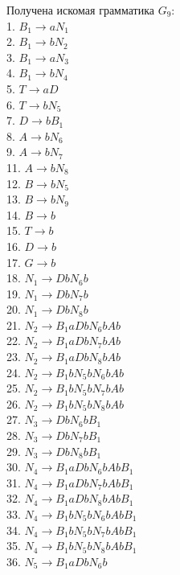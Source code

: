 \documentclass[a4paper,14pt]{extarticle}
\begin{document}
\begin{enumerate}[1.]
Получена искомая грамматика $G_9$:\\
1. $B_1 \rightarrow aN_1$\\
2. $B_1 \rightarrow bN_2$\\
3. $B_1 \rightarrow aN_3$\\
4. $B_1 \rightarrow bN_4$\\
5. $T \rightarrow aD$\\ 
6. $T \rightarrow bN_5$\\
7. $D \rightarrow bB_1$\\
8. $A \rightarrow bN_6$\\
9. $A \rightarrow bN_7$\\
11. $A \rightarrow bN_8$\\
12. $B \rightarrow bN_5$\\ 
13. $B \rightarrow bN_9$\\ 
14. $B \rightarrow b$\\
15. $T \rightarrow b$\\
16. $D \rightarrow b$\\
17. $G \rightarrow b$\\
18. $N_1 \rightarrow DbN_6b$\\
19. $N_1 \rightarrow DbN_7b$\\
20. $N_1 \rightarrow DbN_8b$\\
21. $N_2 \rightarrow B_1aDbN_6bAb$\\
22. $N_2 \rightarrow B_1aDbN_7bAb$\\
23. $N_2 \rightarrow B_1aDbN_8bAb$\\
24. $N_2 \rightarrow B_1bN_5bN_6bAb$\\
25. $N_2 \rightarrow B_1bN_5bN_7bAb$\\
26. $N_2 \rightarrow B_1bN_5bN_8bAb$\\
27. $N_3 \rightarrow DbN_6bB_1$\\
28. $N_3 \rightarrow DbN_7bB_1$\\
29. $N_3 \rightarrow DbN_8bB_1$\\
30. $N_4 \rightarrow B_1aDbN_6bAbB_1$\\
31. $N_4 \rightarrow B_1aDbN_7bAbB_1$\\
32. $N_4 \rightarrow B_1aDbN_8bAbB_1$\\
33. $N_4 \rightarrow B_1bN_5bN_6bAbB_1$\\
34. $N_4 \rightarrow B_1bN_5bN_7bAbB_1$\\
35. $N_4 \rightarrow B_1bN_5bN_8bAbB_1$\\
36. $N_5 \rightarrow B_1aDbN_6b$\\

\end{enumerate}
\end{document}
